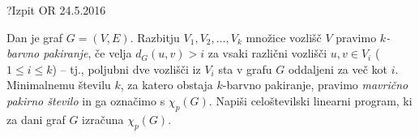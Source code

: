 \begin{naloga}{?}{Izpit OR 24.5.2016}
\begin{vprasanje}
Dan je graf $G = (V, E)$.
Razbitju $V_1, V_2, \dots, V_k$ množice vozlišč $V$
pravimo {\em $k$-barvno pakiranje},
če velja $d_G(u, v) > i$ za vsaki različni vozlišči $u, v \in V_i$
($1 \le i \le k$) --
tj., poljubni dve vozlišči iz $V_i$ sta v grafu $G$ oddaljeni za več kot $i$.
Minimalnemu številu $k$, za katero obstaja $k$-barvno pakiranje,
pravimo {\em mavrično pakirno število} in ga označimo s $\chi_p(G)$.
Napiši celoštevilski linearni program,
ki za dani graf $G$ izračuna $\chi_p(G)$.
\end{vprasanje}
\begin{odgovor}
\end{odgovor}
\end{naloga}
